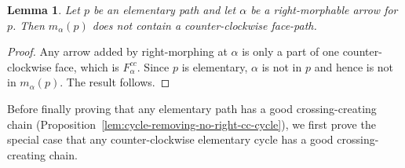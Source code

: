 \documentclass{article}
\newtheorem{lemma}[thm]{Lemma}
\theoremstyle{definition}
\begin{document}
\begin{lemma}\label{lem:right-morph-no-cc-facepath}
	Let $p$ be an elementary path and let $\alpha$ be a right-morphable arrow for $p$. Then $m_\alpha(p)$ does not contain a counter-clockwise face-path.
\end{lemma}
\begin{proof}
	Any arrow added by right-morphing at $\alpha$ is only a part of one counter-clockwise face, which is $F_\alpha^{cc}$. Since $p$ is elementary, $\alpha$ is not in $p$ and hence is not in $m_\alpha(p)$. The result follows.
\end{proof}


Before finally proving that any elementary path has a good crossing-creating chain (Proposition~\ref{lem:cycle-removing-no-right-cc-cycle}), we first prove the special case that any counter-clockwise elementary cycle has a good crossing-creating chain.
\end{document}
